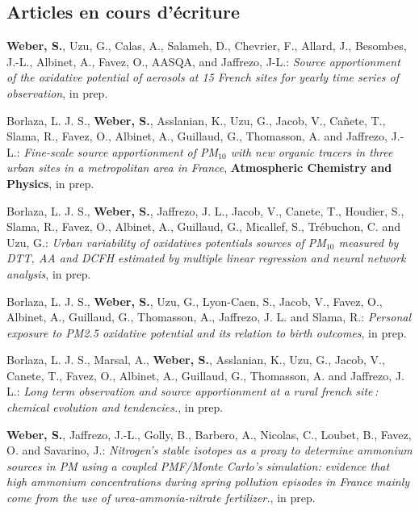 \subsection{Articles en cours d'écriture}
\begin{etaremune}
    \item \textbf{Weber, S.}, Uzu, G., Calas, A., Salameh, D., Chevrier, F., Allard, J.,
        Besombes, J.-L., Albinet, A., Favez, O., AASQA, and Jaffrezo, J-L.: 
        \textit{Source apportionment of the oxidative potential of aerosols at 15 French
        sites for yearly time series of observation}, in prep.
    \item Borlaza, L. J. S., \textbf{Weber, S.}, Asslanian, K., Uzu, G., Jacob, V.,
        Cañete, T., Slama, R., Favez, O., Albinet, A., Guillaud, G., Thomasson, A. and
        Jaffrezo, J.-L.:
        \textit{Fine-scale source apportionment of PM$_{10}$ with new organic tracers in three
        urban sites in a metropolitan area in France},
        \textbf{Atmospheric Chemistry and Physics}, in prep.
    \item Borlaza, L. J. S., \textbf{Weber, S.}, Jaffrezo, J. L., Jacob, V., Canete, T.,
        Houdier, S., Slama, R., Favez, O., Albinet, A., Guillaud, G., Micallef, S.,
        Trébuchon, C. and Uzu, G.:
        \textit{Urban variability of oxidatives potentials sources of PM$_{10}$ measured by
            DTT, AA and DCFH estimated by multiple linear regression and neural network
        analysis}, in prep.
    \item Borlaza, L. J. S., \textbf{Weber, S.}, Uzu, G., Lyon-Caen, S., Jacob, V., Favez,
        O., Albinet, A., Guillaud, G., Thomasson, A., Jaffrezo, J. L. and Slama, R.:
        \textit{Personal exposure to PM2.5 oxidative potential and its relation to birth
        outcomes}, in prep.
    \item Borlaza, L. J. S., Marsal, A., \textbf{Weber, S.}, Asslanian, K., Uzu, G.,
        Jacob, V., Canete, T., Favez, O., Albinet, A., Guillaud, G., Thomasson, A. and
        Jaffrezo, J. L.:
        \textit{Long term observation and source apportionment at a rural french site :
        chemical evolution and tendencies.}, in prep.
    \item \textbf{Weber, S.}, Jaffrezo, J.-L., Golly, B., Barbero, A., Nicolas, C.,
        Loubet, B., Favez, O. and Savarino, J.: 
        \textit{Nitrogen’s stable isotopes as a proxy to determine ammonium sources in PM
            using a coupled PMF/Monte Carlo’s simulation: evidence that high ammonium
            concentrations during spring pollution episodes in France mainly come from the
        use of urea-ammonia-nitrate fertilizer.}, in prep.
\end{etaremune}

